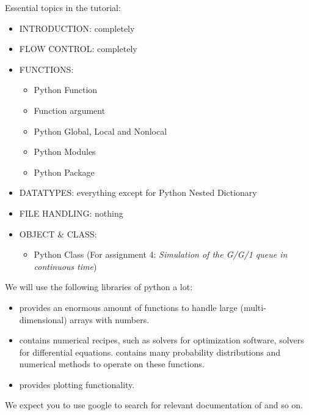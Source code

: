 Essential topics in the tutorial:
\begin{itemize}
\item INTRODUCTION: completely
\item FLOW CONTROL: completely
\item FUNCTIONS: 
	\begin{itemize}
	\item Python Function
	\item Function argument
	\item Python Global, Local and Nonlocal
	\item Python Modules
	\item Python Package
	\end{itemize}
\item DATATYPES: everything except for Python Nested Dictionary
\item FILE HANDLING: nothing
\item OBJECT \& CLASS: 
\begin{itemize}
\item Python Class (For assignment 4: \emph{Simulation of the G/G/1 queue in continuous time})
\end{itemize}
\end{itemize}

We will use the following libraries of python a lot:
\begin{itemize}
\item {}  provides an enormous amount of functions to handle large (multi-dimensional) arrays with numbers. 
\item {} contains numerical recipes, such as solvers for optimization software, solvers for differential equations.  contains many probability distributions and numerical methods to operate on these functions. 
\item {} provides plotting functionality.
\end{itemize}
We expect you to use google to search for relevant documentation of  and so on.

